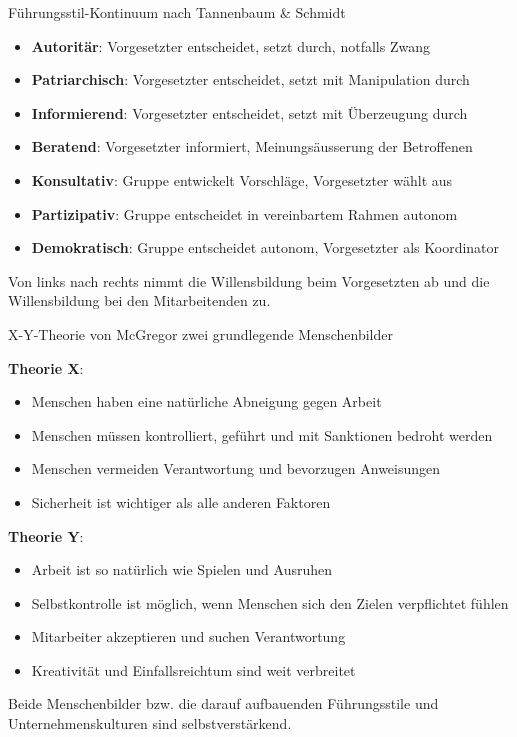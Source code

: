 \begin{concept}{Führungsstil-Kontinuum nach Tannenbaum \& Schmidt}
\begin{itemize}
    \item \textbf{Autoritär}: Vorgesetzter entscheidet, setzt durch, notfalls Zwang
    \item \textbf{Patriarchisch}: Vorgesetzter entscheidet, setzt mit Manipulation durch
    \item \textbf{Informierend}: Vorgesetzter entscheidet, setzt mit Überzeugung durch
    \item \textbf{Beratend}: Vorgesetzter informiert, Meinungsäusserung der Betroffenen
    \item \textbf{Konsultativ}: Gruppe entwickelt Vorschläge, Vorgesetzter wählt aus
    \item \textbf{Partizipativ}: Gruppe entscheidet in vereinbartem Rahmen autonom
    \item \textbf{Demokratisch}: Gruppe entscheidet autonom, Vorgesetzter als Koordinator
\end{itemize}

Von links nach rechts nimmt die Willensbildung beim Vorgesetzten ab und die Willensbildung bei den Mitarbeitenden zu.
\end{concept}

\begin{concept}{X-Y-Theorie von McGregor} zwei grundlegende Menschenbilder

\textbf{Theorie X}:
    \begin{itemize}
        \item Menschen haben eine natürliche Abneigung gegen Arbeit
        \item Menschen müssen kontrolliert, geführt und mit Sanktionen bedroht werden
        \item Menschen vermeiden Verantwortung und bevorzugen Anweisungen
        \item Sicherheit ist wichtiger als alle anderen Faktoren
    \end{itemize}
\textbf{Theorie Y}:
    \begin{itemize}
        \item Arbeit ist so natürlich wie Spielen und Ausruhen
        \item Selbstkontrolle ist möglich, wenn Menschen sich den Zielen verpflichtet fühlen
        \item Mitarbeiter akzeptieren und suchen Verantwortung
        \item Kreativität und Einfallsreichtum sind weit verbreitet
    \end{itemize}
Beide Menschenbilder bzw. die darauf aufbauenden Führungsstile und Unternehmenskulturen sind selbstverstärkend.
\end{concept}

